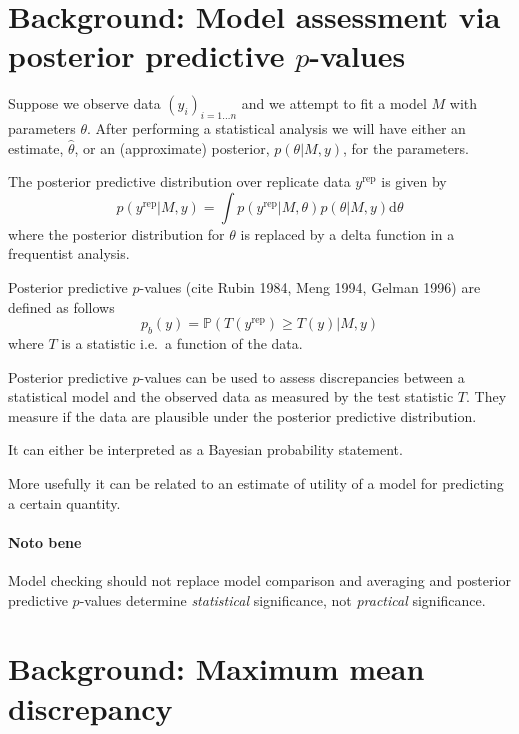 \documentclass{article}
\def\ie{i.e.\ }
\def\eg{e.g.\ }
\begin{document}
\section{Background: Model assessment via posterior predictive $p$-values}

Suppose we observe data $(y_i)_{i=1\ldots n}$ and we attempt to fit a model $M$ with parameters $\theta$.
After performing a statistical analysis we will have either an estimate, $\hat\theta$, or an (approximate) posterior, $p(\theta|M,y)$, for the parameters.

The posterior predictive distribution over replicate data $y^\textrm{rep}$ is given by
\begin{equation}
p(y^\textrm{rep}|M,y) = \int p(y^\textrm{rep}|M,\theta)p(\theta|M,y)\mathrm{d}\theta
\end{equation}
where the posterior distribution for $\theta$ is replaced by a delta function in a frequentist analysis.

Posterior predictive $p$-values (cite Rubin 1984, Meng 1994, Gelman 1996) are defined as follows
\begin{equation}
p_b(y) = \mathbb{P}(T(y^\textrm{rep})\geq T(y)|M,y)
\end{equation}
where $T$ is a statistic \ie a function of the data.

Posterior predictive $p$-values can be used to assess discrepancies between a statistical model and the observed data as measured by the test statistic $T$.
They measure if the data are plausible under the posterior predictive distribution.

\TBD{Give an example \eg skewness}

It can either be interpreted as a Bayesian probability statement.

More usefully it can be related to an estimate of utility of a model for predicting a certain quantity.

\paragraph{Noto bene}

Model checking should not replace model comparison and averaging and posterior predictive $p$-values determine \emph{statistical} significance, not \emph{practical} significance.

\section{Background: Maximum mean discrepancy}
\end{document}

